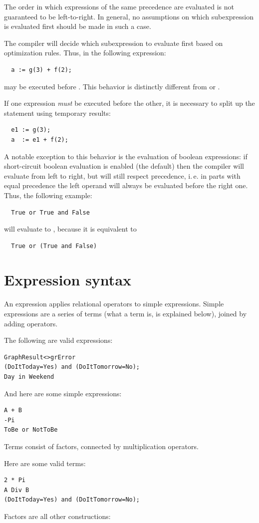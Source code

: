 \begin{remark}
The order in which expressions of the same precedence are evaluated is not
guaranteed to be left-to-right. In general, no assumptions on which subexpression
is evaluated first should be made in such a case.

The compiler will decide which subexpression to evaluate first based on
optimization rules. Thus, in the following expression:
\begin{verbatim}
  a := g(3) + f(2);
\end{verbatim}
 may be executed before . This behavior is distinctly
different from \delphi{} or \tp{}.

If one expression {\em must} be executed before the other, it is necessary
to split up the statement using temporary results:
\begin{verbatim}
  e1 := g(3);
  a  := e1 + f(2);
\end{verbatim}

A notable exception to this behavior is the evaluation of boolean expressions:
if short-circuit boolean evaluation is enabled (the default) then the
compiler will evaluate from left to right, but will still respect
precedence, i.\,e. in parts with equal precedence the left operand will always
be evaluated before the right one. Thus, the following example:
\begin{verbatim}
  True or True and False
\end{verbatim}
will evaluate to , because it is equivalent to
\begin{verbatim}
  True or (True and False)
\end{verbatim}
\end{remark}

\section{Expression syntax}
An expression applies relational operators to simple expressions. Simple
expressions are a series of terms (what a term is, is explained below), joined by
adding operators.

The following are valid expressions:
\begin{verbatim}
GraphResult<>grError
(DoItToday=Yes) and (DoItTomorrow=No);
Day in Weekend
\end{verbatim}
And here are some simple expressions:
\begin{verbatim}
A + B
-Pi
ToBe or NotToBe
\end{verbatim}
Terms consist of factors, connected by multiplication operators.

Here are some valid terms:
\begin{verbatim}
2 * Pi
A Div B
(DoItToday=Yes) and (DoItTomorrow=No);
\end{verbatim}
Factors are all other constructions:


